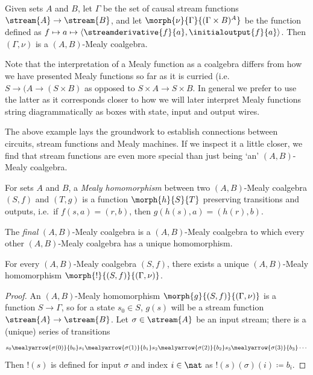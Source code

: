 \documentclass{lmcs}
\begin{document}
\begin{exaC}
    Given sets \(A\) and \(B\), let \(\Gamma\) be the set of causal stream
    functions \(\stream{A} \to \stream{B}\), and let
    \(\morph{\nu}{\Gamma}{(\Gamma \times B)^A}\) be the function defined as \(
    f \mapsto a \mapsto \langle{
        \streamderivative{f}{a},\initialoutput{f}{a}
    }\rangle\).
    Then \((\Gamma,\nu)\) is a \((A,B)\)-Mealy coalgebra.
\end{exaC}

\begin{rem}
    Note that the interpretation of a Mealy function as a coalgebra differs from
    how we have presented Mealy functions so far as it is curried
    (i.e.\ \(S \to (A \to (S \times B)\) as opposed to
    \(S \times A \to S \times B\).
    In general we prefer to use the latter as it corresponds closer to how we
    will later interpret Mealy functions string diagrammatically as boxes
    with state, input and output wires.
\end{rem}

The above example lays the groundwork to establish connections between circuits,
stream functions and Mealy machines.
If we inspect it a little closer, we find that stream functions are even more
special than just being `an' \((A,B)\)-Mealy coalgebra.

\begin{defi}\label{def:mealy-homomorphism}
    For sets \(A\) and \(B\), a \emph{Mealy homomorphism} between two
    \((A,B)\)-Mealy coalgebra \((S,f)\) and \((T,g)\) is a function
    \(\morph{h}{S}{T}\) preserving transitions and
    outputs, i.e.\ if \(f(s,a) = (r,b)\), then \(g(h(s),a) = (h(r),b)\).
\end{defi}

The \emph{final} \((A,B)\)-Mealy coalgebra is a \((A,B)\)-Mealy coalgebra to
which every other \((A,B)\)-Mealy coalgebra has a unique homomorphism.

\begin{propC}
    \label{prop:final-coalgebra}
    For every \((A,B)\)-Mealy coalgebra \((S,f)\), there exists a
    unique \((A,B)\)-Mealy homomorphism \(\morph{{!}}{(S,f)}{(\Gamma,\nu)}\).
\end{propC}
\begin{proof}
    An \((A,B)\)-Mealy homomorphism \(\morph{g}{(S, f)}{(\Gamma, \nu)}\) is a
    function \(S \to \Gamma\), so for a state \(s_0 \in S\), \(g(s)\) will be a
    stream function \(\stream{A} \to \stream{B}\).
    Let \(\sigma \in \stream{A}\) be an input stream; there is a (unique) series
    of transitions \[
        s_0
        \mealyarrow{\sigma(0)}{b_0}
        s_1
        \mealyarrow{\sigma(1)}{b_1}
        s_2
        \mealyarrow{\sigma(2)}{b_2}
        s_3
        \mealyarrow{\sigma(3)}{b_3}
        \cdots
    \]
    Then \(!(s)\) is defined for input \(\sigma\) and
    index \(i \in \nat\) as \(!(s)(\sigma)(i) \coloneqq b_i\).
\end{proof}
\end{document}
